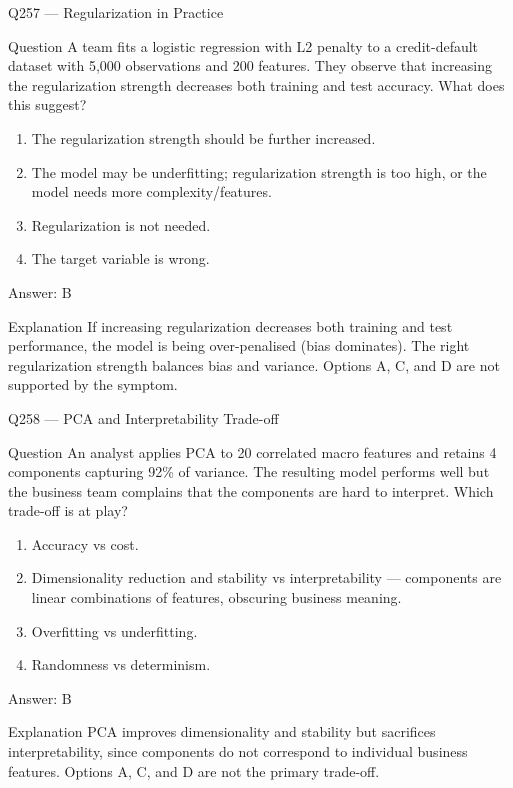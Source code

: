 \documentclass[aspectratio=169,8pt]{beamer}
\begin{document}
\begin{frame}{Q257 --- Regularization in Practice}
\begin{block}{Question}
A team fits a logistic regression with L2 penalty to a credit-default dataset with 5,000 observations and 200 features. They observe that increasing the regularization strength decreases both training and test accuracy. What does this suggest?
\end{block}
\begin{enumerate}
\item The regularization strength should be further increased.
\item The model may be underfitting; regularization strength is too high, or the model needs more complexity/features.
\item Regularization is not needed.
\item The target variable is wrong.
\end{enumerate}
\begin{exampleblock}{Answer: B}\end{exampleblock}
\begin{block}{Explanation}
If increasing regularization decreases both training and test performance, the model is being over-penalised (bias dominates). The right regularization strength balances bias and variance. Options A, C, and D are not supported by the symptom.
\end{block}
\end{frame}

\begin{frame}{Q258 --- PCA and Interpretability Trade-off}
\begin{block}{Question}
An analyst applies PCA to 20 correlated macro features and retains 4 components capturing 92\% of variance. The resulting model performs well but the business team complains that the components are hard to interpret. Which trade-off is at play?
\end{block}
\begin{enumerate}
\item Accuracy vs cost.
\item Dimensionality reduction and stability vs interpretability --- components are linear combinations of features, obscuring business meaning.
\item Overfitting vs underfitting.
\item Randomness vs determinism.
\end{enumerate}
\begin{exampleblock}{Answer: B}\end{exampleblock}
\begin{block}{Explanation}
PCA improves dimensionality and stability but sacrifices interpretability, since components do not correspond to individual business features. Options A, C, and D are not the primary trade-off.
\end{block}
\end{frame}
\end{document}
